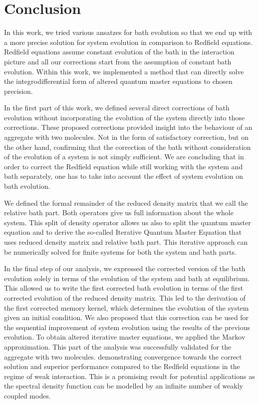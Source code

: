 \chapter*{Conclusion}

In this work, we tried various ansatzes for bath evolution so that we end up with a more precise solution for system evolution in comparison to Redfield equations. Redfield equations assume constant evolution of the bath in the interaction picture and all our corrections start from the assumption of constant bath evolution. Within this work, we implemented a method that can directly solve the integrodifferential form of altered quantum master equations to chosen precision. 

In the first part of this work, we defined several direct corrections of bath evolution without incorporating the evolution of the system directly into those corrections. These proposed corrections provided insight into the behaviour of an aggregate with two molecules. Not in the form of satisfactory correction, but on the other hand, confirming that the correction of the bath without consideration of the evolution of a system is not simply sufficient. We are concluding that in order to correct the Redfield equation while still working with the system and bath separately, one has to take into account the effect of system evolution on bath evolution.

We defined the formal remainder of the reduced density matrix that we call the relative bath part. Both operators give us full information about the whole system. This split of density operator allows us also to split the quantum master equation and to derive the so-called Iterative Quantum Master Equation that uses reduced density matrix and relative bath part. This iterative approach can be numerically solved for finite systems for both the system and bath parts.

In the final step of our analysis, we expressed the corrected version of the bath evolution solely in terms of the evolution of the system and bath at equilibrium. This allowed us to write the first corrected bath evolution in terms of the first corrected evolution of the reduced density matrix. This led to the derivation of the first corrected memory kernel, which determines the evolution of the system given an initial condition. We also proposed that this correction can be used for the sequential improvement of system evolution using the results of the previous evolution. To obtain altered iterative master equations, we applied the Markov approximation. This part of the analysis was successfully validated for the aggregate with two molecules. demonstrating convergence towards the correct solution and superior performance compared to the Redfield equations in the regime of weak interaction. This is a promising result for potential applications as the spectral density function can be modelled by an infinite number of weakly coupled modes. 

